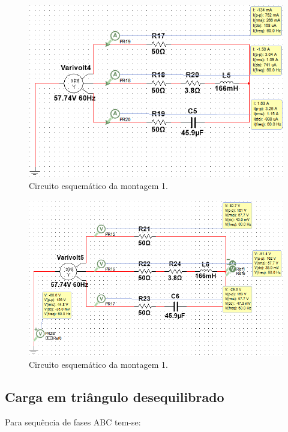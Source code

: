\documentclass[a4paper,12pt,oneside,openany,table,xcdraw]{article}
\begin{document}
\begin{figure}[H]
\centering
\includegraphics[width=13.5cm]{m2-esquema-cba-correntes}
\caption{Circuito esquemático da montagem 1.}
\label{m2:IL}
\end{figure}
\begin{figure}[H]
\centering
\includegraphics[width=13.5cm]{m2-esquema-cba-vf}
\caption{Circuito esquemático da montagem 1.}
\label{m1:VF}
\end{figure}

\subsection{Carga em triângulo desequilibrado}
Para sequência de fases ABC tem-se: 
\end{document}
